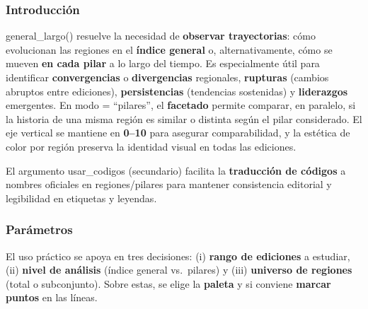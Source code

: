\documentclass[
  11pt,
  letterpaper,
  DIV=11,
  numbers=noendperiod]{scrartcl}
\begin{document}
\subsubsection{\texorpdfstring{\textbf{Introducción}}{Introducción}}\label{introducciuxf3n-6}

general\_largo() resuelve la necesidad de \textbf{observar
trayectorias}: cómo evolucionan las regiones en el \textbf{índice
general} o, alternativamente, cómo se mueven \textbf{en cada pilar} a lo
largo del tiempo. Es especialmente útil para identificar
\textbf{convergencias} o \textbf{divergencias} regionales,
\textbf{rupturas} (cambios abruptos entre ediciones),
\textbf{persistencias} (tendencias sostenidas) y \textbf{liderazgos}
emergentes. En modo = ``pilares'', el \textbf{facetado} permite
comparar, en paralelo, si la historia de una misma región es similar o
distinta según el pilar considerado. El eje vertical se mantiene en
\textbf{0--10} para asegurar comparabilidad, y la estética de color por
región preserva la identidad visual en todas las ediciones.

El argumento usar\_codigos (secundario) facilita la \textbf{traducción
de códigos} a nombres oficiales en regiones/pilares para mantener
consistencia editorial y legibilidad en etiquetas y leyendas.

\subsubsection{\texorpdfstring{\textbf{Parámetros}}{Parámetros}}\label{paruxe1metros-5}

El uso práctico se apoya en tres decisiones: (i) \textbf{rango de
ediciones} a estudiar, (ii) \textbf{nivel de análisis} (índice general
vs.~pilares) y (iii) \textbf{universo de regiones} (total o
subconjunto). Sobre estas, se elige la \textbf{paleta} y si conviene
\textbf{marcar puntos} en las líneas.
\end{document}
